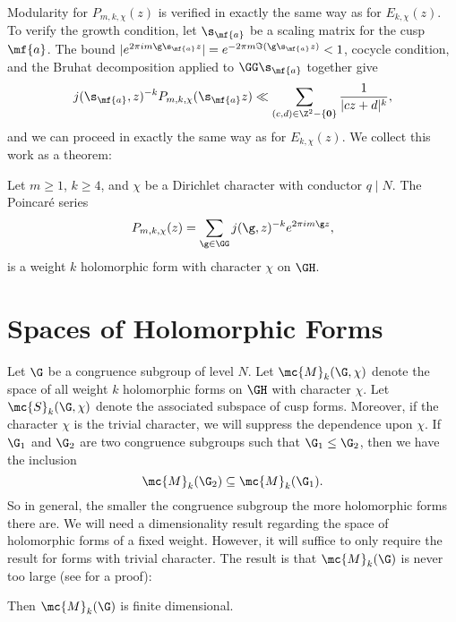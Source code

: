     Modularity for $P_{m,k,\chi}(z)$ is verified in exactly the same way as for $E_{k,\chi}(z)$. To verify the growth condition, let $\s_{\mf{a}}$ be a scaling matrix for the cusp $\mf{a}$. The bound $|e^{2\pi im\g\s_{\mf{a}}z}| = e^{-2\pi m\Im(\g\s_{\mf{a}}z)} < 1$, cocycle condition, and the Bruhat decomposition applied to $\GG\s_{\mf{a}}$ together give
    \[
      j(\s_{\mf{a}},z)^{-k}P_{m,k,\chi}(\s_{\mf{a}}z) \ll \sum_{(c,d) \in \Z^{2}-\{\mathbf{0}\}}\frac{1}{|cz+d|^{k}},
    \]
    and we can proceed in exactly the same way as for $E_{k,\chi}(z)$. We collect this work as a theorem:

    \begin{theorem}
      Let $m \ge 1$, $k \ge 4$, and $\chi$ be a Dirichlet character with conductor $q \mid N$. The Poincar\'e series
      \[
        P_{m,k,\chi}(z) = \sum_{\g \in \GG}j(\g,z)^{-k}e^{2\pi im\g z},
      \]
      is a weight $k$ holomorphic form with character $\chi$ on $\GH$.
    \end{theorem}
  \section{Spaces of Holomorphic Forms}
    Let $\G$ be a congruence subgroup of level $N$. Let $\mc{M}_{k}(\G,\chi)$ denote the space of all weight $k$ holomorphic forms on $\GH$ with character $\chi$. Let $\mc{S}_{k}(\G,\chi)$ denote the associated subspace of cusp forms. Moreover, if the character $\chi$ is the trivial character, we will suppress the dependence upon $\chi$. If $\G_{1}$ and $\G_{2}$ are two congruence subgroups such that $\G_{1} \le \G_{2}$, then we have the inclusion
    \[
      \mc{M}_{k}(\G_{2}) \subseteq \mc{M}_{k}(\G_{1}).
    \]
    So in general, the smaller the congruence subgroup the more holomorphic forms there are. We will need a dimensionality result regarding the space of holomorphic forms of a fixed weight. However, it will suffice to only require the result for forms with trivial character. The result is that $\mc{M}_{k}(\G)$ is never too large (see \cite{diamond2005first} for a proof):

    \begin{theorem}\label{thm:modular_forms_space_classification}
      Then $\mc{M}_{k}(\G)$ is finite dimensional.
    \end{theorem}

